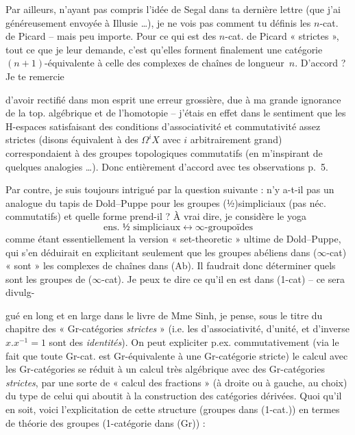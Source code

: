 \documentclass[11pt,a4paper]{article}
\begin{document}
Par ailleurs, n'ayant pas compris l'idée de Segal dans ta dernière lettre (que j'ai généreusement envoyée à Illusie …), je ne vois pas comment tu définis les $n$-cat. de Picard -- mais peu importe. Pour ce qui est des $n$-cat. de Picard « strictes », tout ce que je leur demande, c'est qu'elles forment finalement une catégorie $(n+1)$-équivalente à celle des complexes de chaînes de longueur~$n$. D'accord ? Je te remercie

d'avoir rectifié dans mon esprit une erreur grossière, due à ma grande ignorance de la top. algébrique et de l'homotopie -- j'étais en effet dans le sentiment que les H-espaces satisfaisant des conditions d'associativité et commutativité assez strictes (disons équivalent à des $\Omega^i X$ avec $i$ arbitrairement grand) correspondaient à des groupes topologiques commutatifs (en m'inspirant de quelques analogies …).
Donc entièrement d'accord avec tes observations p.~5.

Par contre, je suis toujours intrigué par la question suivante : n'y a-t-il pas un analogue du tapis de Dold--Puppe pour les groupes (½)simpliciaux (pas néc. commutatifs) et quelle forme prend-il ? À vrai dire, je considère le yoga
\[
\text{ens. ½ simpliciaux} \longleftrightarrow \infty\text{-groupoïdes}
\]
comme étant essentiellement la version « set-theoretic » ultime de Dold--Puppe, qui s'en déduirait en explicitant seulement que les groupes abéliens dans ($\infty$-cat) « sont » les complexes de chaînes dans (Ab). Il faudrait donc déterminer quels sont les groupes de ($\infty$-cat). Je peux te dire ce qu'il en est dans (1-cat) -- ce sera divulg-

gué en long et en large dans le livre de Mme Sinh, je pense, sous le titre du chapitre des « Gr-catégories \emph{strictes} » (i.e. les  d'associativité, d'unité, et d'inverse $x.x^{-1} = 1$ sont des \emph{identités}). On peut expliciter p.ex. commutativement (via le fait que toute Gr-cat. est Gr-équivalente à une Gr-catégorie stricte) le calcul avec les Gr-catégories se réduit à un calcul très algébrique avec des Gr-catégories \emph{strictes}, par une sorte de « calcul des fractions » (à droite ou à gauche, au choix) du type de celui qui aboutit à la construction des catégories dérivées. Quoi qu'il en soit, voici l'explicitation de cette structure (groupes dans (1-cat.)) en termes de théorie des groupes (1-catégorie dans (Gr)) :
\end{document}
